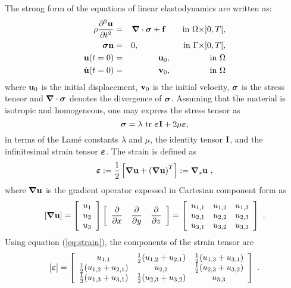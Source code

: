 \documentclass[10pt]{article}
\begin{document}
The strong form of the equations of linear elastodynamics are written as:
\begin{eqnarray}
\rho\frac{\partial^2 \mathbf{u}}{\partial t^2} &=& {\boldsymbol{\nabla}}\cdot{\boldsymbol{\sigma}} + \mathbf{f} \qquad \mbox{in} ~\Omega\times]0,T[, \\
{\boldsymbol{\sigma}} \mathbf{n} &=& 0, \qquad\qquad~~~~ \mbox{in} ~\Gamma\times]0,T[, \nonumber\\
\mathbf{u}(t=0) &=& \mathbf{u}_0, \qquad\qquad~~ \mbox{in} ~\Omega \nonumber\\
\dot{\mathbf{u}}(t=0) &=& \mathbf{v}_0, \qquad\qquad~~ \mbox{in} ~\Omega \nonumber
\end{eqnarray}
where $\mathbf{u}_0$ is the initial displacement, $\mathbf{v}_0$ is the initial velocity, ${\boldsymbol{\sigma}}$ is the stress tensor and ${\boldsymbol{\nabla}}\cdot{\boldsymbol{\sigma}}$ denotes the divergence of ${\boldsymbol{\sigma}}$. Assuming that the material is isotropic and homogeneous, one may express the stress tensor as
\begin{equation}
\label{eq:stressstrain}
{\boldsymbol{\sigma}} = \lambda~\mbox{tr}~{\boldsymbol{\varepsilon}}\mathbf{I} + 2\mu{\boldsymbol{\varepsilon}},
\end{equation}
in terms of the Lam\'{e} constants $\lambda$ and $\mu$, the identity tensor $\mathbf{I}$, and the infinitesimal strain tensor ${\boldsymbol{\varepsilon}}$. The strain is defined as
\begin{equation}
\label{eq:strain}
{\boldsymbol{\varepsilon}} := \frac{1}{2}\left[ {\boldsymbol{\nabla}} \mathbf{u} + \left( {\boldsymbol{\nabla}} \mathbf{u} \right)^{T} \right] := {\boldsymbol{\nabla}}_s\mathbf{u}~,
\end{equation} 
where ${\boldsymbol{\nabla}} \mathbf{u}$ is the gradient operator expessed in Cartesian component form as
\[
[{\boldsymbol{\nabla}} \mathbf{u}] = \left[ \begin{array}{c}u_1\\u_2\\u_3\end{array}\right] 
\left[\begin{array}{ccc} \dfrac{\partial}{\partial x} & \dfrac{\partial}{\partial y} & \dfrac{\partial}{\partial z} \end{array}\right] =
\left[
\begin{array}{ccc} 
u_{1,1} & u_{1,2} & u_{1,3} \\
u_{2,1} & u_{2,2} & u_{2,3} \\
u_{3,1} & u_{3,2} & u_{3,3}
\end{array}
\right] ~.
\]
Using equation (\ref{eq:strain}), the components of the strain tensor are
\[
[{\boldsymbol{\varepsilon}}] = \left[
\begin{array}{ccc} 
u_{1,1} & \frac{1}{2}(u_{1,2}+u_{2,1}) & \frac{1}{2}(u_{1,3}+u_{3,1}) \\
\frac{1}{2}(u_{1,2}+u_{2,1}) & u_{2,2} & \frac{1}{2}(u_{2,3}+u_{3,2}) \\
\frac{1}{2}(u_{1,3}+u_{3,1}) & \frac{1}{2}(u_{2,3}+u_{3,2}) & u_{3,3}
\end{array}
\right] ~.
\]
\end{document}
